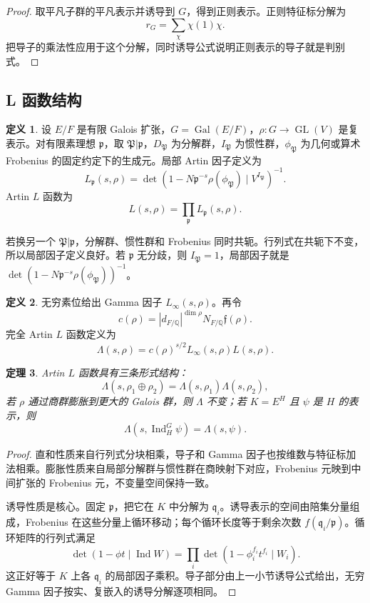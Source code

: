 \documentclass[11pt,a4paper,openany]{ctexbook}
\numberwithin{equation}{chapter}
\newcommand{\Q}{\mathbb{Q}}
\newcommand{\Gal}{\operatorname{Gal}}
\newcommand{\GL}{\operatorname{GL}}
\theoremstyle{plain}
\newtheorem{theorem}{定理}[chapter]
\theoremstyle{definition}
\newtheorem{definition}[theorem]{定义}
\theoremstyle{remark}
\begin{document}
\begin{proof}
取平凡子群的平凡表示并诱导到 $G$，得到正则表示。正则特征标分解为
\[
  r_G=\sum_{\chi}\chi(1)\chi .
\]
把导子的乘法性应用于这个分解，同时诱导公式说明正则表示的导子就是判别式。
\end{proof}

\subsection{L 函数结构}

\begin{definition}
设 $E/F$ 是有限 Galois 扩张，$G=\Gal(E/F)$，$\rho:G\to\GL(V)$ 是复表示。对有限素理想 $\mathfrak p$，取 $\mathfrak P|\mathfrak p$，$D_{\mathfrak P}$ 为分解群，$I_{\mathfrak P}$ 为惯性群，$\phi_{\mathfrak P}$ 为几何或算术 Frobenius 的固定约定下的生成元。局部 Artin 因子定义为
\[
  L_{\mathfrak p}(s,\rho)
  =
  \det\left(1-N\mathfrak p^{-s}\rho(\phi_{\mathfrak P})
  \mid V^{I_{\mathfrak P}}\right)^{-1}.
\]
Artin $L$ 函数为
\[
  L(s,\rho)=\prod_{\mathfrak p}L_{\mathfrak p}(s,\rho).
\]
\end{definition}

若换另一个 $\mathfrak P|\mathfrak p$，分解群、惯性群和 Frobenius 同时共轭。行列式在共轭下不变，所以局部因子定义良好。若 $\mathfrak p$ 无分歧，则 $I_{\mathfrak P}=1$，局部因子就是 $\det(1-N\mathfrak p^{-s}\rho(\phi_{\mathfrak P}))^{-1}$。

\begin{definition}
无穷素位给出 Gamma 因子 $L_\infty(s,\rho)$。再令
\[
  c(\rho)=|d_{F/\Q}|^{\dim\rho}N_{F/\Q}\mathfrak f(\rho).
\]
完全 Artin $L$ 函数定义为
\[
  \Lambda(s,\rho)=c(\rho)^{s/2}L_\infty(s,\rho)L(s,\rho).
\]
\end{definition}

\begin{theorem}
Artin $L$ 函数具有三条形式结构：
\[
  \Lambda(s,\rho_1\oplus\rho_2)=
  \Lambda(s,\rho_1)\Lambda(s,\rho_2),
\]
若 $\rho$ 通过商群膨胀到更大的 Galois 群，则 $\Lambda$ 不变；若 $K=E^H$ 且 $\psi$ 是 $H$ 的表示，则
\[
  \Lambda(s,\operatorname{Ind}_{H}^{G}\psi)=\Lambda(s,\psi).
\]
\end{theorem}

\begin{proof}
直和性质来自行列式分块相乘，导子和 Gamma 因子也按维数与特征标加法相乘。膨胀性质来自局部分解群与惯性群在商映射下对应，Frobenius 元映到中间扩张的 Frobenius 元，不变量空间保持一致。

诱导性质是核心。固定 $\mathfrak p$，把它在 $K$ 中分解为 $\mathfrak q_i$。诱导表示的空间由陪集分量组成，Frobenius 在这些分量上循环移动；每个循环长度等于剩余次数 $f(\mathfrak q_i/\mathfrak p)$。循环矩阵的行列式满足
\[
  \det(1-\phi t\mid \operatorname{Ind}W)
  =
  \prod_i \det(1-\phi_i^{f_i}t^{f_i}\mid W_i).
\]
这正好等于 $K$ 上各 $\mathfrak q_i$ 的局部因子乘积。导子部分由上一小节诱导公式给出，无穷 Gamma 因子按实、复嵌入的诱导分解逐项相同。
\end{proof}
\end{document}
